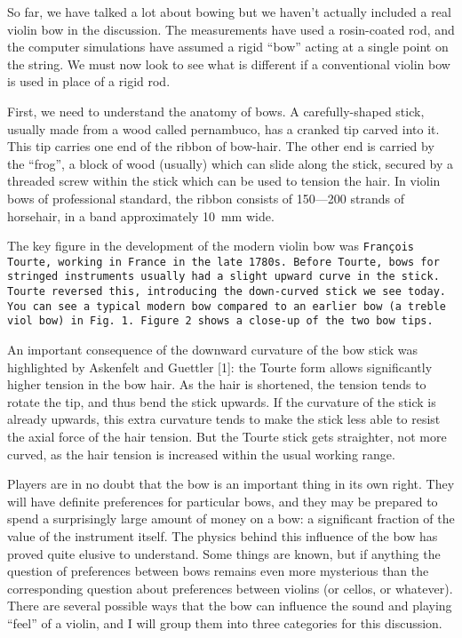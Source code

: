 

  So far, we have talked a lot about bowing but we haven’t actually included a 
  real violin bow in the discussion. The measurements have used a rosin-coated 
  rod, and the computer simulations have assumed a rigid “bow” acting at a 
  single point on the string. We must now look to see what is different if a 
  conventional violin bow is used in place of a rigid rod. 

  First, we need to understand the anatomy of bows. A carefully-shaped stick, 
  usually made from a wood called pernambuco, has a cranked tip carved into it. 
  This tip carries one end of the ribbon of bow-hair. The other end is carried 
  by the “frog”, a block of wood (usually) which can slide along the stick, 
  secured by a threaded screw within the stick which can be used to tension the 
  hair. In violin bows of professional standard, the ribbon consists of 150—200 
  strands of horsehair, in a band approximately 10~mm wide. 

  The key figure in the development of the modern violin bow was \tt{}François Tourte\rm{}, working in France in the late 
  1780s. Before Tourte, bows for stringed instruments usually had a slight 
  upward curve in the stick. Tourte reversed this, introducing the down-curved 
  stick we see today. You can see a typical modern bow compared to an earlier 
  bow (a treble viol bow) in Fig.\ 1. Figure 2 shows a close-up of the two bow 
  tips. 

  An important consequence of the downward curvature of the bow stick was 
  highlighted by Askenfelt and Guettler [1]: the Tourte form allows 
  significantly higher tension in the bow hair. As the hair is shortened, the 
  tension tends to rotate the tip, and thus bend the stick upwards. If the 
  curvature of the stick is already upwards, this extra curvature tends to make 
  the stick less able to resist the axial force of the hair tension. But the 
  Tourte stick gets straighter, not more curved, as the hair tension is 
  increased within the usual working range. 

  Players are in no doubt that the bow is an important thing in its own right. 
  They will have definite preferences for particular bows, and they may be 
  prepared to spend a surprisingly large amount of money on a bow: a 
  significant fraction of the value of the instrument itself. The physics 
  behind this influence of the bow has proved quite elusive to understand. Some 
  things are known, but if anything the question of preferences between bows 
  remains even more mysterious than the corresponding question about 
  preferences between violins (or cellos, or whatever). There are several 
  possible ways that the bow can influence the sound and playing “feel” of a 
  violin, and I will group them into three categories for this discussion. 

